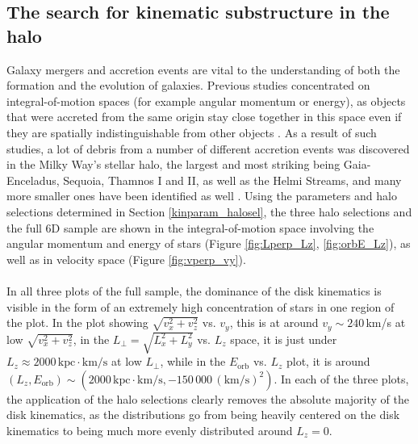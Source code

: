 \documentclass[a4paper,11pt]{article}
\begin{document}
\subsection{The search for kinematic substructure in the halo}\label{kin_substr}
Galaxy mergers and accretion events are vital to the understanding of both the formation and the evolution of galaxies. Previous studies concentrated on integral-of-motion spaces (for example angular momentum or energy), as objects that were accreted from the same origin stay close together in this space even if they are spatially indistinguishable from other objects \citep[see, e.g.,][]{helmi17,ruizlara22}. As a result of such studies, a lot of debris from a number of different accretion events was discovered in the Milky Way’s stellar halo, the largest and most striking being Gaia-Enceladus, Sequoia, Thamnos I and II, as well as the Helmi Streams, and many more smaller ones have been identified as well \cite[e.g.][]{koppelman19a,naidu20,helmi18}. Using the parameters and halo selections determined in Section \ref{kinparam_halosel}, the three halo selections and the full 6D sample are shown in the integral-of-motion space involving the angular momentum and energy of stars (Figure \ref{fig:Lperp_Lz}, \ref{fig:orbE_Lz}), as well as in velocity space (Figure \ref{fig:vperp_vy}).\\ \\
%
In all three plots of the full sample, the dominance of the disk kinematics is visible in the form of an extremely high concentration of stars in one region of the plot. In the plot showing $\sqrt{v_x^2+v_z^2}$ vs. $v_y$, this is at around $v_y\sim240$\,km/s at low $\sqrt{v_x^2+v_z^2}$, in the $L_\perp=\sqrt{L_x^2+L_y^2}$ vs. $L_z$ space, it is just under $L_z\approx2000\,\mathrm{kpc}{\cdot}\mathrm{km/s}$ at low $L_\perp$, while in the $E_\mathrm{orb}$ vs. $L_z$ plot, it is around $(L_z,E_\mathrm{orb})\sim(2000\,\mathrm{kpc}{\cdot}\mathrm{km/s},-150\,000\,\mathrm{(km/s)}^2)$. In each of the three plots, the application of the halo selections clearly removes the absolute majority of the disk kinematics, as the distributions go from being heavily centered on the disk kinematics to being much more evenly distributed around $L_z=0$.
%
\end{document}
